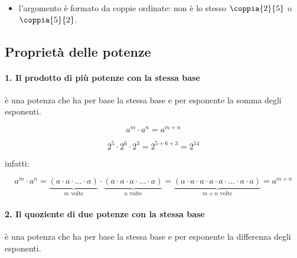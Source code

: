 \begin{osservazione}{}{}
\begin{itemize} [nosep]
\item l'argomento è formato da coppie ordinate: non è lo stesso 
\(\coppia{2}{5}\) o \(\coppia{5}{2}\).
\end{itemize}

\end{osservazione}

\subsection{Proprietà delle potenze}

\paragraph{1. Il prodotto di più potenze con la stessa base} 
è una potenza che ha per base la stessa base e per esponente la somma degli 
esponenti.

\begin{minipage}[c]{.35\textwidth}
\vspace{4.5mm}
 \[\boxed{a^m \cdot a^n = a^{m+n}}\]
\end{minipage}
\hfil
\begin{minipage}[c]{.35\textwidth}
\[ 2^5 \cdot 2^6 \cdot 2^3 = 2^{5+6+3}=2^{14}\]
\end{minipage}
\hfil
\begin{minipage}[c]{.25\textwidth}
\vspace{4.5mm}
\centering infatti:
\end{minipage}
\[ a^m \cdot a^n = \underbrace{(a\cdot a\cdot\ldots\cdot a)}_{m\text{ 
volte}}\cdot%
 \underbrace{(a\cdot a\cdot a\cdot\ldots\cdot a)}_{n\text{ volte}}
 =\underbrace{(a\cdot a\cdot a\cdot a\cdot a\cdot\ldots\cdot a\cdot 
a)}_{m+n\text{ volte}}%
 =a^{m+n}\]
\vspace{-1em}
\paragraph{2. Il quoziente di due potenze con la stessa base} 
è una potenza che ha per base la stessa base e per esponente la differenza 
degli esponenti.

